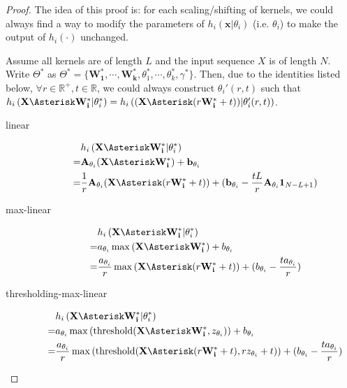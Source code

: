 \documentclass[12pt]{article}
\newcommand{\vect}[1]{\mathbf{#1}}
\newcommand{\matrixSymbol}[1]{\mathbf{#1}}
\begin{document}
\begin{proof}

The idea of this proof is: for each scaling/shifting of kernels, we could always find a way to modify the parameters of $h_i(\vect{x}|\theta_i)$ (i.e. $\theta_i$) to make the output of $h_i(\cdot)$ unchanged.

Assume all kernels are of length $L$ and the input sequence $X$ is of length $N$. Write $\Theta^{*}$ as $\Theta^{*} = \{ \matrixSymbol{W_1^*}, \cdots, \matrixSymbol{W_k^*}, \theta_1^*, \cdots, \theta_k^*, \gamma^* \} $. Then, due to the identities listed below, $ \forall r \in \mathbb{R}^{+}, t \in \mathbb{R}$, we could always construct $\theta_i'(r, t)$ such that  $h_i \left( \matrixSymbol{X} \Asterisk \matrixSymbol{W_{i}^*}  | \theta_i^* \right) = h_i \left( ( \matrixSymbol{X} \Asterisk (r \matrixSymbol{W_{i}^*} + t) )  | \theta_i'(r, t) \right)$.
\begin{description}
\item[linear] \begin{align} 
  & h_i \left( \matrixSymbol{X} \Asterisk \matrixSymbol{W_{i}^*}  | \theta_i^* \right) \notag \\
= & \matrixSymbol{A}_{\theta_i} (\matrixSymbol{X} \Asterisk \matrixSymbol{W_{i}^*} ) + \vect{b}_{\theta_i} \\
= & \frac{1}{r}\matrixSymbol{A}_{\theta_i} (\matrixSymbol{X} \Asterisk (r \matrixSymbol{W_{i}^*} + t)) + (\vect{b}_{\theta_i} - \frac{tL}{r}\matrixSymbol{A}_{\theta_i}\vect{1}_{N-L+1}) \notag  \end{align}
\item[max-linear] \begin{align} 
  & h_i \left( \matrixSymbol{X} \Asterisk \matrixSymbol{W_{i}^*}  | \theta_i^* \right) \notag \\
= & a_{\theta_i}\max{( \matrixSymbol{X} \Asterisk \matrixSymbol{W_{i}^*} )} + b_{\theta_i} \\ 
= & \frac{a_{\theta_i}}{r}\max{( \matrixSymbol{X} \Asterisk (r \matrixSymbol{W_{i}^*} + t))} + (b_{\theta_i} - \frac{ta_{\theta_i}}{r}) \notag \end{align}
\item[thresholding-max-linear] \begin{align} 
  & h_i \left( \matrixSymbol{X} \Asterisk \matrixSymbol{W_{i}^*}  | \theta_i^* \right) \notag \\
= & a_{\theta_i}\max{(\mathrm{threshold}( \matrixSymbol{X} \Asterisk \matrixSymbol{W_{i}^*}, z_{\theta_i} ))} + b_{\theta_i} \\ 
= & \frac{a_{\theta_i}}{r}\max{( \mathrm{threshold}( \matrixSymbol{X} \Asterisk (r\matrixSymbol{W_{i}^*}+t), rz_{\theta_i}+t )  )} + ( b_{\theta_i} -  \frac{ta_{\theta_i}}{r} ) \notag \end{align}
\end{description}


\end{proof}
\end{document}
